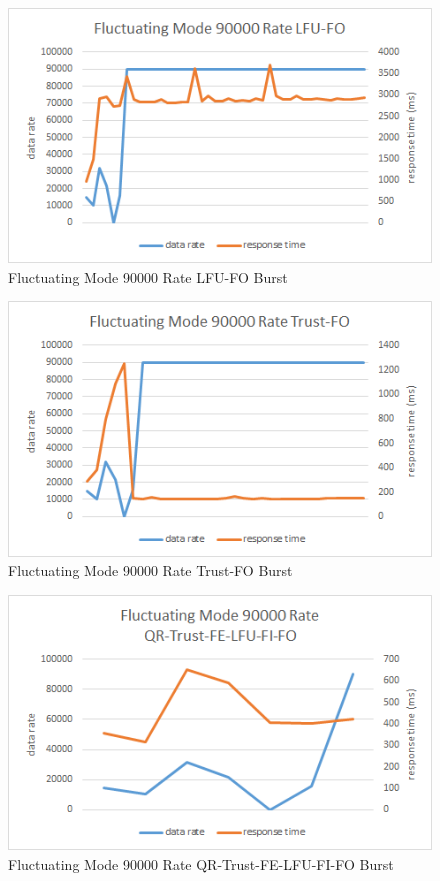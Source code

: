 \begin{figure}[!htbp]
	\centering
	\includegraphics[width=\textwidth]{img/app3-f-90000-lfufo.png}
	\caption{Fluctuating Mode 90000 Rate LFU-FO Burst}
\end{figure}
\begin{figure}[!htbp]
	\centering
	\includegraphics[width=\textwidth]{img/app3-f-90000-trustfo.png}
	\caption{Fluctuating Mode 90000 Rate Trust-FO Burst}
\end{figure}
\begin{figure}[!htbp]
	\centering
	\includegraphics[width=\textwidth]{img/app3-f-90000-qrtrustfelfufifo.png}
	\caption{Fluctuating Mode 90000 Rate QR-Trust-FE-LFU-FI-FO Burst}
\end{figure}